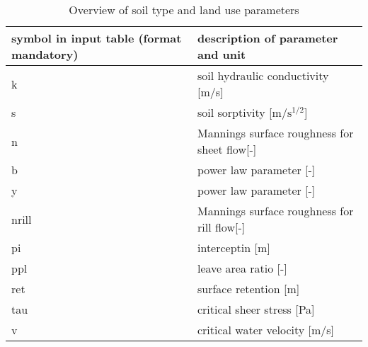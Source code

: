 \begin{table}%
  \centering
    \caption{Overview of soil type and land use parameters}
    \begin{tabular}{p{3.8cm}l}
    \hline  \hline
        symbol in input table (format mandatory) & description of parameter and unit \\
    \hline
        k&  soil hydraulic conductivity [m/s]\\
        s&  soil sorptivity [$\mathrm{m/s^{1/2}}$]\\
        n&   Mannings surface roughness for sheet flow[-] \\
        b&   power law parameter [-] \\
        y&   power law parameter [-] \\
        nrill&  Mannings surface roughness for rill flow[-] \\
        pi&   interceptin [m]\\
        ppl& leave area ratio [-] \\
        ret& surface retention [m] \\
        tau& critical sheer stress [Pa] \\
        v &  critical water velocity [m/s] \\
    \hline  \hline
    \end{tabular}%
  \label{tab:soilveg}%
\end{table}%
